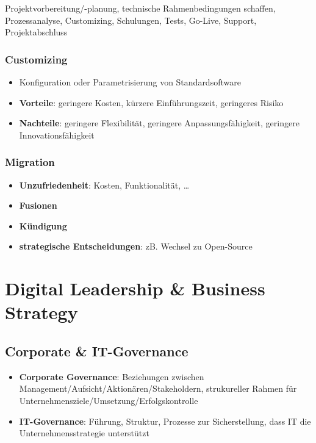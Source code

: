 \documentclass{article}
\begin{document}
Projektvorbereitung/-planung, technische Rahmenbedingungen schaffen, Prozessanalyse, Customizing, Schulungen, Tests, Go-Live, Support, Projektabschluss

\subsubsection{Customizing}

\begin{itemize}
  \item Konfiguration oder Parametrisierung von Standardsoftware
  \item \textbf{Vorteile}: geringere Kosten, kürzere Einführungszeit, geringeres Risiko
  \item \textbf{Nachteile}: geringere Flexibilität, geringere Anpassungsfähigkeit, geringere Innovationsfähigkeit
\end{itemize}

\subsubsection{Migration}

\begin{itemize}
  \item \textbf{Unzufriedenheit}: Kosten, Funktionalität, …
  \item \textbf{Fusionen}
  \item \textbf{Kündigung}
  \item \textbf{strategische Entscheidungen}: zB. Wechsel zu Open-Source
\end{itemize}

\section{Digital Leadership \& Business Strategy}

\subsection{Corporate \& IT-Governance}

\begin{itemize}
  \item \textbf{Corporate Governance}: Beziehungen zwischen Management/Aufsicht/Aktionären/Stakeholdern, strukureller Rahmen für Unternehmensziele/Umsetzung/Erfolgskontrolle
  \item \textbf{IT-Governance}: Führung, Struktur, Prozesse zur Sicherstellung, dass IT die Unternehmensstrategie unterstützt
\end{itemize}
\end{document}
